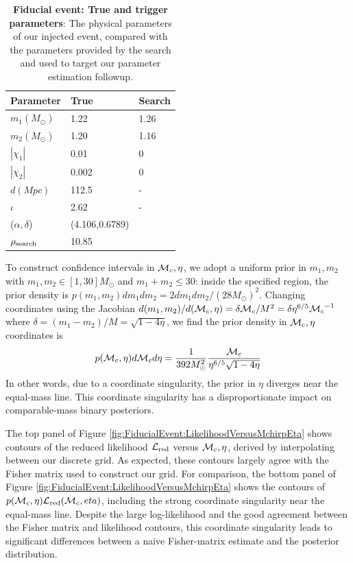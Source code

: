 \begin{table}
\begin{tabular}{l|ll}
Parameter & True & Search \\ \hline
$m_1 (M_\odot)$ &  1.22 & 1.26 \\
$m_2 (M_\odot)$ &  1.20 & 1.16 \\
$|\chi_1| $ & 0.01  & 0 \\
$|\chi_2| $ & 0.002 & 0 \\
$d (\unit{Mpc}) $ & 112.5 & - \\
$\iota $ & 2.62 & - \\
($\alpha,\delta$) & (4.106,0.6789) &\\ 
$\rho_{\rm search}$ & 10.85 \\
\end{tabular}
\caption{\label{tab:FiducialEvent:Parameters}\textbf{Fiducial event: True and trigger parameters}: The physical parameters of our injected event, compared
  with the parameters provided by the search and used to target our parameter estimation followup.
}
\end{table}

To construct confidence intervals in ${{\cal M}_c},\eta$, we adopt a uniform prior in $m_1,m_2$ with $m_1,m_2\in[1,30]M_\odot$
and $m_1+m_2\le 30$: inside the specified region, the prior density is $p(m_1,m_2)dm_1dm_2=2 dm_1 dm_2/(28 M_\odot)^2$.
Changing coordinates using the Jacobian $d(m_1,m_2)/d({{\cal M}_c},\eta)= \delta {{\cal M}_c}/M^2 = \delta \eta^{6/5}{{\cal M}_c}^{-1}$ where
$\delta = (m_1-m_2)/M = \sqrt{1-4\eta}$, we find the prior density in ${{\cal M}_c},\eta$ coordinates is
\begin{eqnarray}
p({{\cal M}_c},\eta) d{{\cal M}_c} d\eta =  \frac{1}{392 M_\odot^2} \frac{{{\cal M}_c}}{\eta^{6/5}\sqrt{1-4\eta}}
\end{eqnarray}
%
In other words, due to a coordinate singularity, the prior in $\eta$ diverges near the equal-mass line.  
%
This coordinate singularity has a disproportionate impact on comparable-mass binary posteriors.


The top panel of Figure \ref{fig:FiducialEvent:LikelihoodVersusMchirpEta} shows contours of the reduced likelihood ${\cal L}_{\rm red}$ versus
${{\cal M}_c},\eta$, derived by interpolating between our discrete grid.   As expected, these contours largely agree with the
Fisher matrix used to construct our grid. 
%
For comparison, the bottom panel of Figure \ref{fig:FiducialEvent:LikelihoodVersusMchirpEta} shows the contours of
$p({{\cal M}_c},\eta){\cal L}_{\rm red}({{\cal M}_c},eta)$, including the strong coordinate singularity near the equal-mass line.  
%
Despite the large log-likelihood and the good agreement between the Fisher matrix and likelihood contours, this
coordinate singularity leads to significant differences between a naive 
Fisher-matrix estimate and the posterior distribution.



